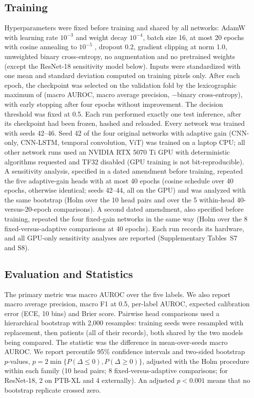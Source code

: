 \documentclass[journal]{IEEEtran}
\begin{document}
\subsection{Training}
Hyperparameters were fixed before training and shared by all networks: AdamW \cite{loshchilov2019adamw} with learning rate $10^{-3}$ and weight decay $10^{-4}$, batch size 16, at most 20 epochs with cosine annealing to $10^{-5}$ \cite{loshchilov2017sgdr}, dropout 0.2, gradient clipping at norm 1.0, unweighted binary cross-entropy, no augmentation and no pretrained weights (except the ResNet-18 sensitivity model below). Inputs were standardized with one mean and standard deviation computed on training pixels only. After each epoch, the checkpoint was selected on the validation fold by the lexicographic maximum of (macro AUROC, macro average precision, $-$binary cross-entropy), with early stopping after four epochs without improvement. The decision threshold was fixed at 0.5. Each run performed exactly one test inference, after its checkpoint had been frozen, hashed and reloaded. Every network was trained with seeds 42--46. Seed 42 of the four original networks with adaptive gain (CNN-only, CNN-LSTM, temporal convolution, ViT) was trained on a laptop CPU; all other network runs used an NVIDIA RTX 5070 Ti GPU with deterministic algorithms requested and TF32 disabled (GPU training is not bit-reproducible). A sensitivity analysis, specified in a dated amendment before training, repeated the five adaptive-gain heads with at most 40 epochs (cosine schedule over 40 epochs, otherwise identical; seeds 42--44, all on the GPU) and was analyzed with the same bootstrap (Holm over the 10 head pairs and over the 5 within-head 40-versus-20-epoch comparisons). A second dated amendment, also specified before training, repeated the four fixed-gain networks in the same way (Holm over the 8 fixed-versus-adaptive comparisons at 40 epochs). Each run records its hardware, and all GPU-only sensitivity analyses are reported (Supplementary Tables~S7 and S8).

\subsection{Evaluation and Statistics}
The primary metric was macro AUROC over the five labels. We also report macro average precision, macro F1 at 0.5, per-label AUROC, expected calibration error (ECE, 10 bins) \cite{guo2017calibration} and Brier score. Pairwise head comparisons used a hierarchical bootstrap with 2{,}000 resamples: training seeds were resampled with replacement, then patients (all of their records), both shared by the two models being compared. The statistic was the difference in mean-over-seeds macro AUROC. We report percentile 95\% confidence intervals and two-sided bootstrap $p$-values, $p=2\min\{P(\Delta\le0),P(\Delta\ge0)\}$, adjusted with the Holm procedure within each family (10 head pairs; 8 fixed-versus-adaptive comparisons; for ResNet-18, 2 on PTB-XL and 4 externally). An adjusted $p<0.001$ means that no bootstrap replicate crossed zero.
\end{document}
